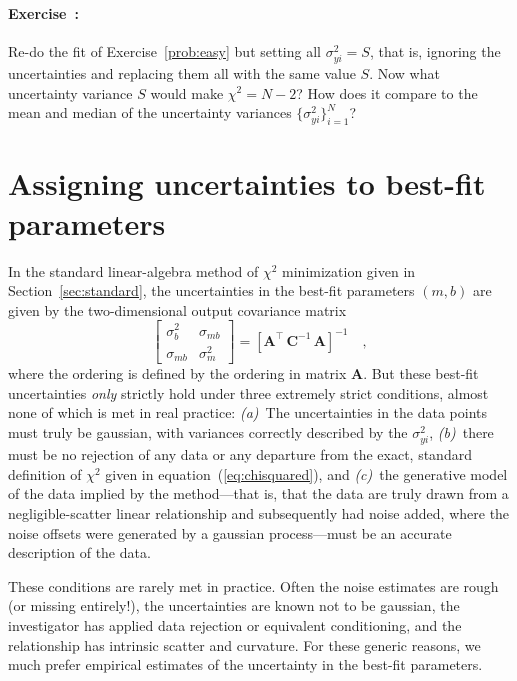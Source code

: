 \documentclass[12pt]{article}
\newcommand{\sectionname}{Section}
\newcommand{\equationname}{equation}
\newcommand{\problemname}{Exercise}
\newcounter{problem}
\newenvironment{problem}{\paragraph{\problemname~\theproblem:}\refstepcounter{problem}}{}
\newcommand{\mmatrix}[1]{\boldsymbol{#1}}
\newcommand{\inverse}[1]{{#1}^{-1}}
\newcommand{\transpose}[1]{{#1}^{\scriptscriptstyle \top}}
\newcommand{\mA}{\mmatrix{A}}
\newcommand{\mAT}{\transpose{\mA}}
\newcommand{\mC}{\mmatrix{C}}
\newcommand{\mCinv}{\inverse{\mC}}
\newcommand{\setofall}[3]{\{{#1}\}_{{#2}}^{{#3}}}
\newcommand{\allsigmay}{\setofall{\sigma_{yi}^2}{i=1}{N}}
\begin{document}
\begin{problem}
Re-do the fit of \problemname~\ref{prob:easy} but setting all
$\sigma_{yi}^2=S$, that is, ignoring the uncertainties and replacing
them all with the same value $S$.  Now what uncertainty variance $S$
would make $\chi^2 = N-2$?  How does it compare to the mean and median
of the uncertainty variances $\allsigmay$?
\end{problem}

\section{Assigning uncertainties to best-fit parameters}\label{sec:uncertainty}

In the standard linear-algebra method of $\chi^2$ minimization given
in \sectionname~\ref{sec:standard}, the uncertainties in the best-fit
parameters $(m,b)$ are given by the two-dimensional output covariance
matrix
\begin{equation}
\left[\begin{array}{cc}
\sigma_{b}^2 & \sigma_{mb} \\
\sigma_{mb} & \sigma_{m}^2
\end{array}\right] = \inverse{\left[\mAT\,\mCinv\,\mA\right]} \quad ,
\end{equation}
where the ordering is defined by the ordering in matrix $\mA$.  But
these best-fit uncertainties \emph{only} strictly hold under three
extremely strict conditions, almost none of which is met in real
practice: \textsl{(a)}~The uncertainties in the data points must truly
be gaussian, with variances correctly described by the
$\sigma_{yi}^2$, \textsl{(b)}~there must be no rejection of any data
or any departure from the exact, standard definition of $\chi^2$ given
in \equationname~(\ref{eq:chisquared}), and \textsl{(c)}~the
generative model of the data implied by the method---that is, that the
data are truly drawn from a negligible-scatter linear relationship and
subsequently had noise added, where the noise offsets were generated
by a gaussian process---must be an accurate description of the data.

These conditions are rarely met in practice.  Often the noise
estimates are rough (or missing entirely!), the uncertainties are
known not to be gaussian, the investigator has applied data rejection
or equivalent conditioning, and the relationship has intrinsic scatter
and curvature.  For these generic reasons, we much prefer empirical
estimates of the uncertainty in the best-fit parameters.
\end{document}
